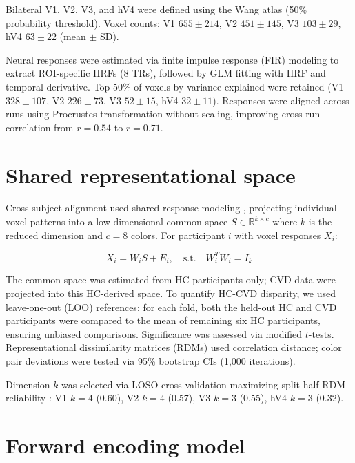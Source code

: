 Bilateral V1, V2, V3, and hV4 were defined using the Wang atlas \cite{wang2015} (50\% probability threshold). Voxel counts: V1 $655 \pm 214$, V2 $451 \pm 145$, V3 $103 \pm 29$, hV4 $63 \pm 22$ (mean $\pm$ SD).

Neural responses were estimated via finite impulse response (FIR) modeling \cite{dale1999, brouwer2009} to extract ROI-specific HRFs (8 TRs), followed by GLM fitting with HRF and temporal derivative. Top 50\% of voxels by variance explained were retained (V1 $328 \pm 107$, V2 $226 \pm 73$, V3 $52 \pm 15$, hV4 $32 \pm 11$). Responses were aligned across runs using Procrustes transformation \cite{gower1975} without scaling, improving cross-run correlation from $r = 0.54$ to $r = 0.71$.

\section{Shared representational space}

Cross-subject alignment used shared response modeling \cite{chen2015}, projecting individual voxel patterns into a low-dimensional common space $S \in \mathbb{R}^{k \times c}$ where $k$ is the reduced dimension and $c = 8$ colors. For participant $i$ with voxel responses $X_i$:

\begin{equation}
X_i = W_i S + E_i, \quad \text{s.t.} \quad W_i^T W_i = I_k
\end{equation}

The common space was estimated from HC participants only; CVD data were projected into this HC-derived space. To quantify HC-CVD disparity, we used leave-one-out (LOO) references: for each fold, both the held-out HC and CVD participants were compared to the mean of remaining six HC participants, ensuring unbiased comparisons. Significance was assessed via \textcite{crawford1998} modified $t$-tests. Representational dissimilarity matrices (RDMs) used correlation distance; color pair deviations were tested via 95\% bootstrap CIs (1,000 iterations).

Dimension $k$ was selected via LOSO cross-validation maximizing split-half RDM reliability \cite{cunningham2014}: V1 $k = 4$ (0.60), V2 $k = 4$ (0.57), V3 $k = 3$ (0.55), hV4 $k = 3$ (0.32).

\section{Forward encoding model}


